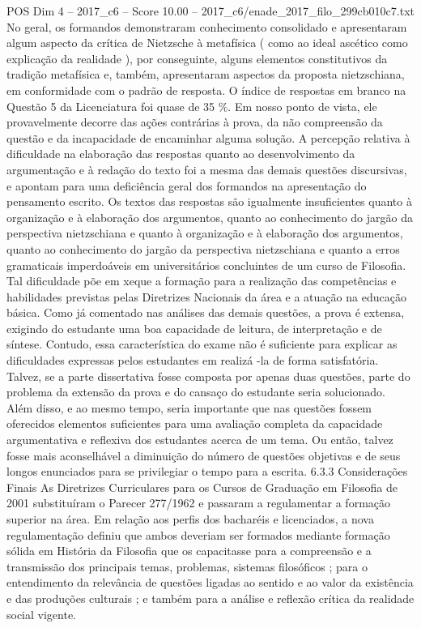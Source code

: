 \begin{textsample}{POS Dim 4 – 2017\_c6 – Score 10.00 – 2017\_c6/enade\_2017\_filo\_299cb010c7.txt}
No geral, os formandos demonstraram conhecimento consolidado e apresentaram algum aspecto da crítica de Nietzsche à metafísica ( como ao ideal ascético como explicação da realidade ), por conseguinte, alguns elementos constitutivos da tradição metafísica e, também, apresentaram aspectos da proposta nietzschiana, em conformidade com o padrão de resposta.
O índice de respostas em branco na Questão 5 da Licenciatura foi quase de 35 \%.
Em nosso ponto de vista, ele provavelmente decorre das ações contrárias à prova, da não compreensão da questão e da incapacidade de encaminhar alguma solução.
A percepção relativa à dificuldade na elaboração das respostas quanto ao desenvolvimento da argumentação e à redação do texto foi a mesma das demais questões discursivas, e apontam para uma deficiência geral dos formandos na apresentação do pensamento escrito.
Os textos das respostas são igualmente insuficientes quanto à organização e à elaboração dos argumentos, quanto ao conhecimento do jargão da perspectiva nietzschiana e quanto à organização e à elaboração dos argumentos, quanto ao conhecimento do jargão da perspectiva nietzschiana e quanto a erros gramaticais imperdoáveis em universitários concluintes de um curso de Filosofia.
Tal dificuldade põe em xeque a formação para a realização das competências e habilidades previstas pelas Diretrizes Nacionais da área e a atuação na educação básica.
Como já comentado nas análises das demais questões, a prova é extensa, exigindo do estudante uma boa capacidade de leitura, de interpretação e de síntese.
Contudo, essa característica do exame não é suficiente para explicar as dificuldades expressas pelos estudantes em realizá -la de forma satisfatória.
Talvez, se a parte dissertativa fosse composta por apenas duas questões, parte do problema da extensão da prova e do cansaço do estudante seria solucionado.
Além disso, e ao mesmo tempo, seria importante que nas questões fossem oferecidos elementos suficientes para uma avaliação completa da capacidade argumentativa e reflexiva dos estudantes acerca de um tema.
Ou então, talvez fosse mais aconselhável a diminuição do número de questões objetivas e de seus longos enunciados para se privilegiar o tempo para a escrita. 6.3.3 Considerações Finais As Diretrizes Curriculares para os Cursos de Graduação em Filosofia de 2001 substituíram o Parecer 277/1962 e passaram a regulamentar a formação superior na área.
Em relação aos perfis dos bacharéis e licenciados, a nova regulamentação definiu que ambos deveriam ser formados mediante formação sólida em História da Filosofia que os capacitasse para a compreensão e a transmissão dos principais temas, problemas, sistemas filosóficos ; para o entendimento da relevância de questões ligadas ao sentido e ao valor da existência e das produções culturais ; e também para a análise e reflexão crítica da realidade social vigente.

\end{textsample}
